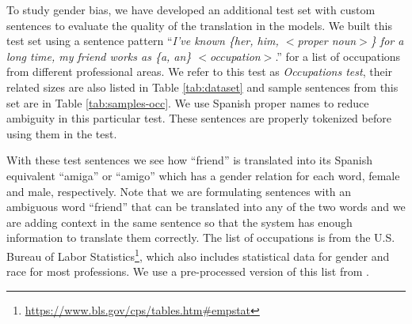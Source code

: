 \documentclass[11pt,a4paper]{article}
\begin{document}
To study gender bias, we have developed an additional test set with custom sentences to evaluate the quality of the translation in the models. 
We built this test set using a sentence pattern ``\textit{I've known \{her, him, $<$proper noun$>$\} for a long time, my friend works as \{a, an\} $<$occupation$>$}.'' for a list of occupations from different professional areas.
We refer to this test as \textit{Occupations test}, their related sizes are also listed in Table \ref{tab:dataset} and sample sentences from this set are in Table \ref{tab:samples-occ}.
We use Spanish proper names to reduce ambiguity in this particular test.
These sentences are properly tokenized before using them in the test.

With these test sentences we see how ``friend'' is translated into its Spanish equivalent ``amiga'' or ``amigo'' which has a gender relation for each word, female and male, respectively. Note that we are formulating sentences with an ambiguous word ``friend'' that can be translated into any of the two words and we are adding context in the same sentence so that the system has enough information to translate them correctly. 
The list of occupations is from the U.S. Bureau of Labor Statistics\footnote{\url{https://www.bls.gov/cps/tables.htm\#empstat}}, which also includes statistical data for gender and race for most professions.
We use a pre-processed version of this list from \cite{prates:2018}. 
\end{document}
